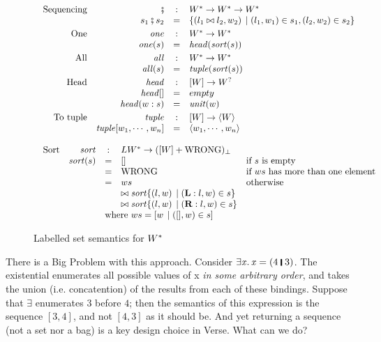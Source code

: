 \begin{figure}
$$\begin{array}{l}
\begin{array}{rrcll}
\text{Sequencing} & \msemi & : & \mtype \rightarrow \mtype \rightarrow \mtype \\
&  s_1 \msemi s_2 & = & \scompr{(\lblsemi{l_1}{l_2}, w_2)}{\sbind{(l_1,w_1)}{s_1}, \sbind{(l_2,w_2)}{s_2}} \\[1mm]
\text{One}  & \mone & : & \mtype \rightarrow \mtype \\
& \mone(s) & = & \shead (\msort( s)) \\[1mm]
\text{All}  & \mall & : & \mtype \rightarrow \mtype \\
 & \mall(s) & = & \stuple (\msort( s) ) \\[1mm]
\text{Head}  & \shead & : & [\Value] \rightarrow \mtyped \\
             & \shead [] & = & empty \\
             & \shead (w \scons s) & = & \munits{w} \\[1mm]
\text{To tuple} & \stuple & : & [\Value] \rightarrow \tuple{\Value} \\
     & \stuple [w_1, \cdots, w_n] & = & \tuple{w_1,\cdots,w_n} \\
  \end{array} \\
\\
\begin{array}{rrcll}
\text{Sort} & \msort & : & \LblValue^{*} \rightarrow \mlift{([\Value] + \wrong)}\\
& \msort(s) & = & []  & \text{if $s$ is empty} \\
&  & = & \wrong & \text{if $ws$ has more than one element} \\
&& = & ws & \text{otherwise} \\
  &&& \sconcat \msort \scompr{(l,w)}{\sbind{(\lblleft:l,w)}{s}} \\
  &&& \sconcat \msort \scompr{(l,w)}{\sbind{(\lblright:l,w)}{s}} \\
&& \multicolumn{3}{l}{\text{where $ws = \mcompr{w}{\sbind{([],w)}{s}}$}}
\end{array}

\end{array}
$$
\caption{Labelled set semantics for $\mtype$}
\label{fig:labelled-sem}
\end{figure}

There is a Big Problem with this approach.  Consider \ensuremath{\exists\Varid{x}.\,\Varid{x}\mathrel{=}(\mathrm{4}\;\rule[-0.3mm]{0.5mm}{2.5mm}\;\mathrm{3})}.  The existential
enumerates all possible values of x \emph{in some arbitrary order}, and takes the union (i.e. concatention)
of the results from each of these bindings.  Suppose that \ensuremath{\exists} enumerates \ensuremath{\mathrm{3}} before \ensuremath{\mathrm{4}}; then
the semantics of this expression is the sequence $[3,4]$, and not $[4,3]$ as it should be.
And yet returning a sequence (not a set nor a bag) is a key design choice in Verse.  What can we do?


